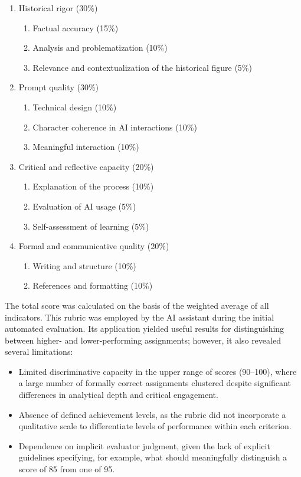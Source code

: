 \documentclass[english]{textolivre}
\begin{document}
\begin{enumerate}
    \item Historical rigor (30\%)
    \begin{enumerate}
        \item Factual accuracy (15\%)
        \item Analysis and problematization (10\%)
        \item Relevance and contextualization of the historical figure (5\%)
    \end{enumerate}
    \item Prompt quality (30\%)
    \begin{enumerate}
        \item Technical design (10\%)
        \item Character coherence in AI interactions (10\%)
        \item Meaningful interaction (10\%)
    \end{enumerate}
    \item Critical and reflective capacity (20\%)
    \begin{enumerate}
        \item Explanation of the process (10\%)
        \item Evaluation of AI usage (5\%)
        \item Self-assessment of learning (5\%)
    \end{enumerate}
    \item Formal and communicative quality (20\%)
    \begin{enumerate}
        \item Writing and structure (10\%)
        \item References and formatting (10\%)
    \end{enumerate}
\end{enumerate}

The total score was calculated on the basis of the weighted average of all indicators. This rubric was employed by the AI assistant during the initial automated evaluation. Its application yielded useful results for distinguishing between higher- and lower-performing assignments; however, it also revealed several limitations:

\begin{itemize}
    \item Limited discriminative capacity in the upper range of scores (90–100), where a large number of formally correct assignments clustered despite significant differences in analytical depth and critical engagement.
    \item Absence of defined achievement levels, as the rubric did not incorporate a qualitative scale to differentiate levels of performance within each criterion.
    \item Dependence on implicit evaluator judgment, given the lack of explicit guidelines specifying, for example, what should meaningfully distinguish a score of 85 from one of 95.
\end{itemize}
\end{document}
